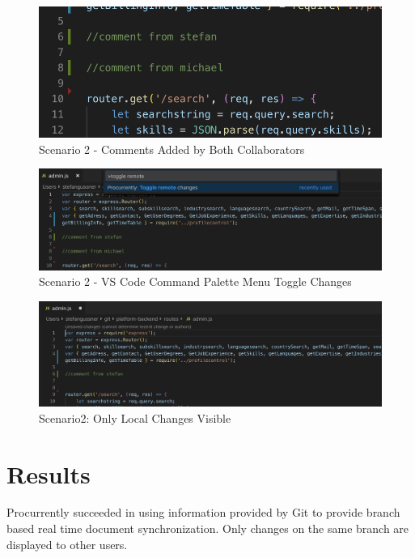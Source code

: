 \begin{figure}
    \centering
    \includegraphics[width=1\textwidth]{figures/screenshots/scenarios/2comments.png}
    \caption{Scenario 2 - Comments Added by Both Collaborators}
    \label{fig:2comments}
\end{figure}
\begin{figure}
    \centering
    \includegraphics[width=1\linewidth]{figures/screenshots/scenarios/2togglechanges.png}
    \caption{Scenario 2 - VS Code Command Palette Menu Toggle Changes}
    \label{fig:2togglechanges}
\end{figure}

\begin{figure}[hb]
    \centering
    \includegraphics[width=1\textwidth]{figures/screenshots/scenarios/2onlylocalchanges.png}
	\caption{Scenario2: Only Local Changes Visible}
    \label{fig:2onlylocalchanges}
\end{figure}

\section{Results}
Procurrently succeeded in using information provided by Git to provide branch based real time document synchronization. Only changes on the same branch are displayed to other users.

